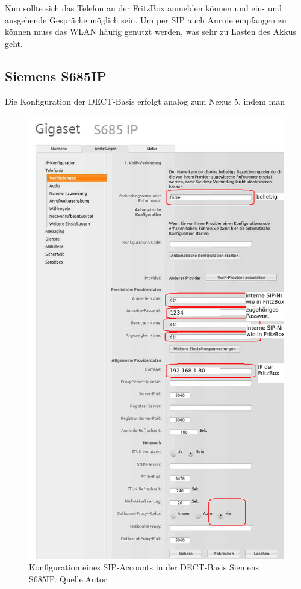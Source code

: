 \documentclass[a4paper,12pt]{scrbook}
\begin{document}
Nun sollte sich das Telefon an der FritzBox anmelden können und ein- und ausgehende Gespräche möglich sein.
Um per SIP auch Anrufe empfangen zu können muss das WLAN häufig genutzt werden, was sehr zu Lasten des Akkus geht.

\subsection{Siemens S685IP}
Die Konfiguration der DECT-Basis erfolgt analog zum Nexus 5. indem man 

\begin{figure}[H]
\begin{center}
\includegraphics[width=.8\hsize]{./images/voip-client-s685ip-01.png}
\end{center}
\caption[Konfiguration eines SIP-Accounts in der DECT-Basis Siemens S685IP]
{\label{voip-client-nexus5}Konfiguration eines SIP-Accounts in der DECT-Basis Siemens S685IP. Quelle:Autor}
\end{figure}
\end{document}
